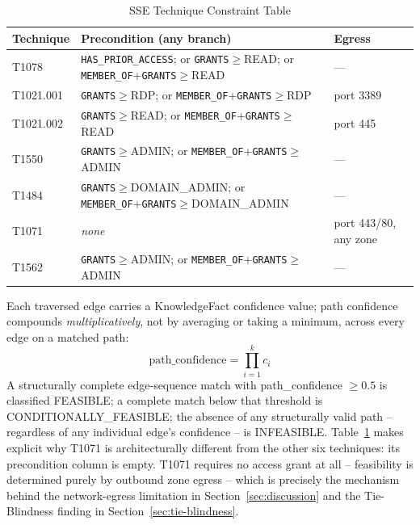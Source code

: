 \documentclass[conference]{IEEEtran}
\begin{document}
\begin{table}[t]
\centering
\caption{SSE Technique Constraint Table}
\label{tab:sse}
\begin{tabular}{@{}p{1.7cm}p{4.2cm}p{1.3cm}@{}}
\toprule
\textbf{Technique} & \textbf{Precondition (any branch)} & \textbf{Egress} \\
\midrule
T1078 & \texttt{HAS\_PRIOR\_ACCESS}; or \texttt{GRANTS}$\geq$READ; or \texttt{MEMBER\_OF}+\texttt{GRANTS}$\geq$READ & --- \\
T1021.001 & \texttt{GRANTS}$\geq$RDP; or \texttt{MEMBER\_OF}+\texttt{GRANTS}$\geq$RDP & port 3389 \\
T1021.002 & \texttt{GRANTS}$\geq$READ; or \texttt{MEMBER\_OF}+\texttt{GRANTS}$\geq$READ & port 445 \\
T1550 & \texttt{GRANTS}$\geq$ADMIN; or \texttt{MEMBER\_OF}+\texttt{GRANTS}$\geq$ADMIN & --- \\
T1484 & \texttt{GRANTS}$\geq$DOMAIN\_ADMIN; or \texttt{MEMBER\_OF}\allowbreak+\texttt{GRANTS}$\geq$DOMAIN\_ADMIN & --- \\
T1071 & \textit{none} & port 443/80, any zone \\
T1562 & \texttt{GRANTS}$\geq$ADMIN; or \texttt{MEMBER\_OF}+\texttt{GRANTS}$\geq$ADMIN & --- \\
\bottomrule
\end{tabular}
\end{table}

Each traversed edge carries a KnowledgeFact confidence value; path confidence compounds \textit{multiplicatively}, not by averaging or taking a minimum, across every edge on a matched path:
$$\text{path\_confidence} = \prod_{i=1}^{k} c_i$$
A structurally complete edge-sequence match with path\_confidence $\geq 0.5$ is classified FEASIBLE; a complete match below that threshold is CONDITIONALLY\_FEASIBLE; the absence of any structurally valid path -- regardless of any individual edge's confidence -- is INFEASIBLE. Table~\ref{tab:sse} makes explicit why T1071 is architecturally different from the other six techniques: its precondition column is empty. T1071 requires no access grant at all -- feasibility is determined purely by outbound zone egress -- which is precisely the mechanism behind the network-egress limitation in Section~\ref{sec:discussion} and the Tie-Blindness finding in Section~\ref{sec:tie-blindness}.
\end{document}
